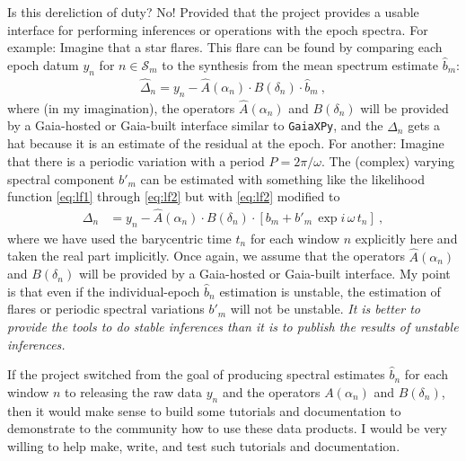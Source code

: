 \documentclass[11pt]{article}
\begin{document}
Is this dereliction of duty? No! Provided that the project provides a usable interface for performing inferences or operations with the epoch spectra.
For example: Imagine that a star flares. This flare can be found by comparing each epoch datum $y_n$ for $n\in\mathscr{S}_m$ to the synthesis from the mean spectrum estimate $\hat{b}_m$:
\begin{align}
    \hat{\Delta}_n = y_n - \hat{A}(\alpha_n)\cdot B(\delta_n)\cdot \hat{b}_m ~,
\end{align}
where (in my imagination), the operators $\hat{A}(\alpha_n)$ and $B(\delta_n)$ will be provided by a Gaia-hosted or Gaia-built interface similar to \texttt{GaiaXPy},
and the $\hat{\Delta}_n$ gets a hat because it is an estimate of the residual at the epoch.
For another: Imagine that there is a periodic variation with a period $P=2\pi/\omega$.
The (complex) varying spectral component $b'_m$ can be estimated with something like the likelihood function \eqref{eq:lf1} through \eqref{eq:lf2} but with \eqref{eq:lf2} modified to
\begin{align}
    \Delta_n &= y_n - \hat{A}(\alpha_n)\cdot B(\delta_n)\cdot [b_m + b'_m\,\exp{i\,\omega\,t_n}] ~,
\end{align}
where we have used the barycentric time $t_n$ for each window $n$ explicitly here and taken the real part implicitly.
Once again, we assume that the operators $\hat{A}(\alpha_n)$ and $B(\delta_n)$ will be provided by a Gaia-hosted or Gaia-built interface.
My point is that even if the individual-epoch $\hat{b}_n$ estimation is unstable, the estimation of flares or periodic spectral variations $b'_m$ will not be unstable.
\emph{It is better to provide the tools to do stable inferences than it is to publish the results of unstable inferences.}

If the project switched from the goal of producing spectral estimates $\hat{b}_n$ for each window $n$ to releasing the raw data $y_n$ and the operators $A(\alpha_n)$ and $B(\delta_n)$, then it would make sense to build some tutorials and documentation to demonstrate to the community how to use these data products.
I would be very willing to help make, write, and test such tutorials and documentation.
\end{document}
